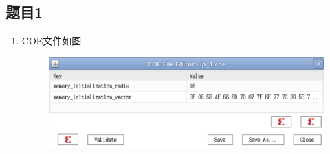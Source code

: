 \documentclass{article}
\begin{document}
    \subsection*{题目1}
    \begin{enumerate}
        \item []COE文件如图
        \begin{figure}[htbp]
            \centering
            \includegraphics[scale=0.8]{coe1.png}
        \end{figure}


\end{enumerate}
\end{document}
